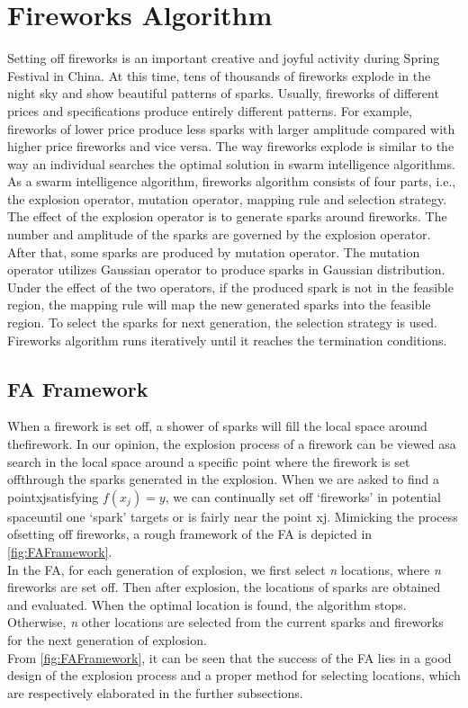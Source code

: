 \documentclass[11pt, a4paper]{report}
\begin{document}
\newpage

\section{Fireworks Algorithm}
Setting off fireworks is an important creative and joyful activity during Spring Festival in China. At this time, tens of thousands of fireworks explode in the night sky and show beautiful patterns of sparks. Usually, fireworks of different prices and specifications produce entirely different patterns. For example, fireworks of lower price produce less sparks with larger amplitude compared with higher price fireworks and vice versa. The way fireworks explode is similar to the way an individual searches the optimal solution in swarm intelligence algorithms. As a swarm intelligence algorithm, fireworks algorithm consists of four parts, i.e., the explosion operator, mutation operator, mapping rule and selection strategy. The effect of the explosion operator is to generate sparks around fireworks. The number and amplitude of the sparks are governed by the explosion operator. After that, some sparks are produced by mutation operator. The mutation operator utilizes Gaussian operator to produce sparks in Gaussian distribution. Under the effect of the two operators, if the produced spark is not in the feasible region, the mapping rule will map the new generated sparks into the feasible region. To select the sparks for next generation, the selection strategy is used. Fireworks algorithm runs iteratively until it reaches the termination conditions.

\subsection{FA Framework}

When a ﬁrework is set off, a shower of sparks will ﬁll the local space around theﬁrework. In our opinion, the explosion process of a ﬁrework can be viewed asa search in the local space around a speciﬁc point where the ﬁrework is set oﬀthrough the sparks generated in the explosion. When we are asked to ﬁnd a pointxjsatisfying $ f(x_{j})=y $, we can continually set oﬀ ‘ﬁreworks’ in potential spaceuntil one ‘spark’ targets or is fairly near the point xj. Mimicking the process ofsetting oﬀ ﬁreworks, a rough framework of the FA is depicted in \ref{fig:FAFramework}. \\

In the FA, for each generation of explosion, we first select \textit{n} locations, where \textit{n} fireworks are set off. Then after explosion, the locations of sparks are obtained and evaluated. When the optimal location is found, the algorithm stops. Otherwise, \textit{n} other locations are selected from the current sparks and fireworks for the next generation of explosion.
\\
From \ref{fig:FAFramework}, it can be seen that the success of the FA lies in a good design
of the explosion process and a proper method for selecting locations, which are
respectively elaborated in the further subsections.
\end{document}
